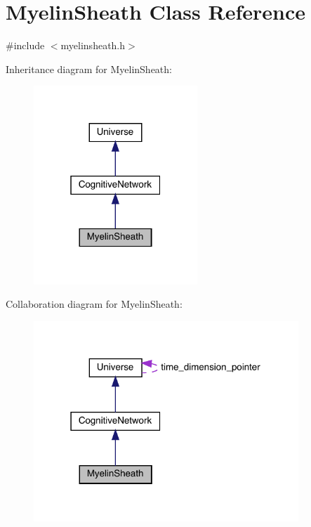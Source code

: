 \hypertarget{class_myelin_sheath}{}\section{Myelin\+Sheath Class Reference}
\label{class_myelin_sheath}


{\ttfamily \#include $<$myelinsheath.\+h$>$}



Inheritance diagram for Myelin\+Sheath\+:\nopagebreak
\begin{figure}[H]
\begin{center}
\leavevmode
\includegraphics[width=175pt]{class_myelin_sheath__inherit__graph}
\end{center}
\end{figure}


Collaboration diagram for Myelin\+Sheath\+:\nopagebreak
\begin{figure}[H]
\begin{center}
\leavevmode
\includegraphics[width=283pt]{class_myelin_sheath__coll__graph}
\end{center}
\end{figure}
